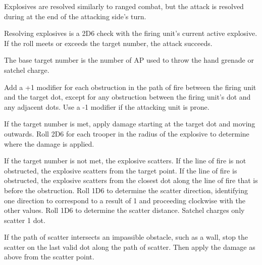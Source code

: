 Explosives are resolved similarly to ranged combat, but the attack is resolved during at the end of the attacking side's turn.

Resolving explosives is a 2D6 check with the firing unit's current active explosive.
If the roll meets or exceeds the target number, the attack succeeds.

The base target number is the number of AP used to throw the hand grenade or satchel charge.

Add a +1 modifier for each obstruction in the path of fire between the firing unit and the target dot, except for any obstruction between the firing unit's dot and any adjacent dots.
Use a -1 modifier if the attacking unit is prone.

If the target number is met, apply damage starting at the target dot and moving outwards.
Roll 2D6 for each trooper in the radius of the explosive to determine where the damage is applied.

If the target number is not met, the explosive scatters.
If the line of fire is not obstructed, the explosive scatters from the target point.
If the line of fire is obstructed, the explosive scatters from the closest dot along the line of fire that is before the obstruction.
Roll 1D6 to determine the scatter direction, identifying one direction to correspond to a result of 1 and proceeding clockwise with the other values.
Roll 1D6 to determine the scatter distance.
Satchel charges only scatter 1 dot.

If the path of scatter intersects an impassible obstacle, such as a wall, stop the scatter on the last valid dot along the path of scatter.
Then apply the damage as above from the scatter point.
